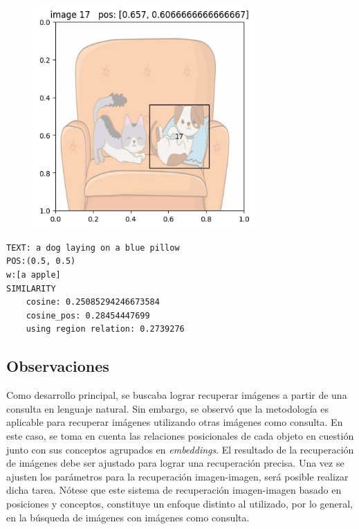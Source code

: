 \begin{figure}[H]
\centering
 \includegraphics[height=85mm]{Graphics/dog_pillow.jpg}
 \caption{ }
 \label{fig:dogs_pillow}
\end{figure}
\begin{verbatim}
TEXT: a dog laying on a blue pillow
POS:(0.5, 0.5)
w:[a apple]
SIMILARITY
    cosine: 0.25085294246673584
    cosine_pos: 0.28454447699
    using region relation: 0.2739276
\end{verbatim}


\subsection{Observaciones}
Como desarrollo principal, se buscaba lograr recuperar im\'agenes a partir de una consulta en lenguaje natural. Sin embargo, se observó que la metodología es aplicable para recuperar im\'agenes utilizando otras im\'agenes como consulta. En este caso, se toma en cuenta las relaciones posicionales de cada objeto en cuestión junto con sus conceptos agrupados en \textit{embeddings}. El resultado de la recuperación de im\'agenes debe ser ajustado para lograr una recuperación precisa. Una vez se ajusten los par\'ametros para la recuperación imagen-imagen, ser\'a posible realizar dicha tarea. N\'otese que este sistema de recuperaci\'on imagen-imagen basado en posiciones y conceptos, constituye un enfoque distinto al utilizado, por lo general, en la b\'usqueda de im\'agenes con im\'agenes como consulta.


